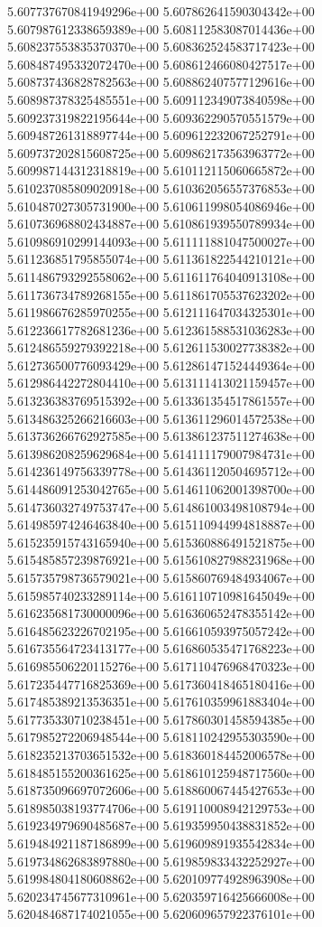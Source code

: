 5.607737670841949296e+00
5.607862641590304342e+00
5.607987612338659389e+00
5.608112583087014436e+00
5.608237553835370370e+00
5.608362524583717423e+00
5.608487495332072470e+00
5.608612466080427517e+00
5.608737436828782563e+00
5.608862407577129616e+00
5.608987378325485551e+00
5.609112349073840598e+00
5.609237319822195644e+00
5.609362290570551579e+00
5.609487261318897744e+00
5.609612232067252791e+00
5.609737202815608725e+00
5.609862173563963772e+00
5.609987144312318819e+00
5.610112115060665872e+00
5.610237085809020918e+00
5.610362056557376853e+00
5.610487027305731900e+00
5.610611998054086946e+00
5.610736968802434887e+00
5.610861939550789934e+00
5.610986910299144093e+00
5.611111881047500027e+00
5.611236851795855074e+00
5.611361822544210121e+00
5.611486793292558062e+00
5.611611764040913108e+00
5.611736734789268155e+00
5.611861705537623202e+00
5.611986676285970255e+00
5.612111647034325301e+00
5.612236617782681236e+00
5.612361588531036283e+00
5.612486559279392218e+00
5.612611530027738382e+00
5.612736500776093429e+00
5.612861471524449364e+00
5.612986442272804410e+00
5.613111413021159457e+00
5.613236383769515392e+00
5.613361354517861557e+00
5.613486325266216603e+00
5.613611296014572538e+00
5.613736266762927585e+00
5.613861237511274638e+00
5.613986208259629684e+00
5.614111179007984731e+00
5.614236149756339778e+00
5.614361120504695712e+00
5.614486091253042765e+00
5.614611062001398700e+00
5.614736032749753747e+00
5.614861003498108794e+00
5.614985974246463840e+00
5.615110944994818887e+00
5.615235915743165940e+00
5.615360886491521875e+00
5.615485857239876921e+00
5.615610827988231968e+00
5.615735798736579021e+00
5.615860769484934067e+00
5.615985740233289114e+00
5.616110710981645049e+00
5.616235681730000096e+00
5.616360652478355142e+00
5.616485623226702195e+00
5.616610593975057242e+00
5.616735564723413177e+00
5.616860535471768223e+00
5.616985506220115276e+00
5.617110476968470323e+00
5.617235447716825369e+00
5.617360418465180416e+00
5.617485389213536351e+00
5.617610359961883404e+00
5.617735330710238451e+00
5.617860301458594385e+00
5.617985272206948544e+00
5.618110242955303590e+00
5.618235213703651532e+00
5.618360184452006578e+00
5.618485155200361625e+00
5.618610125948717560e+00
5.618735096697072606e+00
5.618860067445427653e+00
5.618985038193774706e+00
5.619110008942129753e+00
5.619234979690485687e+00
5.619359950438831852e+00
5.619484921187186899e+00
5.619609891935542834e+00
5.619734862683897880e+00
5.619859833432252927e+00
5.619984804180608862e+00
5.620109774928963908e+00
5.620234745677310961e+00
5.620359716425666008e+00
5.620484687174021055e+00
5.620609657922376101e+00
